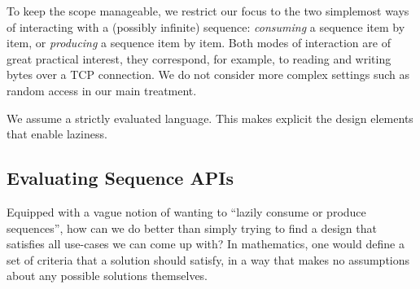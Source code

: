 \documentclass[sigplan,screen,10pt,review]{acmart}
\begin{document}

To keep the scope manageable, we restrict our focus to the two simplemost ways of interacting with a (possibly infinite) sequence: \textit{consuming} a sequence item by item, or \textit{producing} a sequence item by item. Both modes of interaction are of great practical interest, they correspond, for example, to reading and writing bytes over a TCP connection. We do not consider more complex settings such as random access in our main treatment.

We assume a strictly evaluated language. This makes explicit the design elements that enable laziness.

\subsection{Evaluating Sequence APIs}

Equipped with a vague notion of wanting to ``lazily consume or produce sequences'', how can we do better than simply trying to find a design that satisfies all use-cases we can come up with? In mathematics, one would define a set of criteria that a solution should satisfy, in a way that makes no assumptions about any possible solutions themselves.
\end{document}
